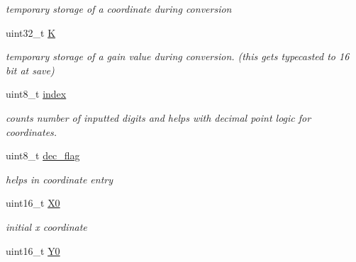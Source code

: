 \begin{DoxyCompactItemize}
\begin{DoxyCompactList}\small\item\em temporary storage of a coordinate during conversion \end{DoxyCompactList}\item 
\hypertarget{classtask__read_a5868630ef3d9aaad8a3293e12f4a16e7}{uint32\-\_\-t \hyperlink{classtask__read_a5868630ef3d9aaad8a3293e12f4a16e7}{K}}\label{classtask__read_a5868630ef3d9aaad8a3293e12f4a16e7}

\begin{DoxyCompactList}\small\item\em temporary storage of a gain value during conversion. (this gets typecasted to 16 bit at save) \end{DoxyCompactList}\item 
\hypertarget{classtask__read_a39948fc8e8abcee6168bd97b7ee9b8ff}{uint8\-\_\-t \hyperlink{classtask__read_a39948fc8e8abcee6168bd97b7ee9b8ff}{index}}\label{classtask__read_a39948fc8e8abcee6168bd97b7ee9b8ff}

\begin{DoxyCompactList}\small\item\em counts number of inputted digits and helps with decimal point logic for coordinates. \end{DoxyCompactList}\item 
\hypertarget{classtask__read_ad6cdc46c93f6414df1db82bb3b37d779}{uint8\-\_\-t \hyperlink{classtask__read_ad6cdc46c93f6414df1db82bb3b37d779}{dec\-\_\-flag}}\label{classtask__read_ad6cdc46c93f6414df1db82bb3b37d779}

\begin{DoxyCompactList}\small\item\em helps in coordinate entry \end{DoxyCompactList}\item 
\hypertarget{classtask__read_a4e731afdd8d8ce60c4a4a22a18bbf839}{uint16\-\_\-t \hyperlink{classtask__read_a4e731afdd8d8ce60c4a4a22a18bbf839}{X0}}\label{classtask__read_a4e731afdd8d8ce60c4a4a22a18bbf839}

\begin{DoxyCompactList}\small\item\em initial x coordinate \end{DoxyCompactList}\item 
\hypertarget{classtask__read_a28efd7b77196b1cf7d581114c77bd607}{uint16\-\_\-t \hyperlink{classtask__read_a28efd7b77196b1cf7d581114c77bd607}{Y0}}\label{classtask__read_a28efd7b77196b1cf7d581114c77bd607}


\end{DoxyCompactItemize}

